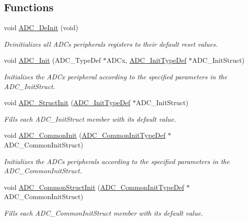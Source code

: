 \subsection*{Functions}
\begin{DoxyCompactItemize}
\item 
void \hyperlink{group___a_d_c_ga1962afdd9eebe5c896bbba2e4f26fe09}{A\-D\-C\-\_\-\-De\-Init} (void)
\begin{DoxyCompactList}\small\item\em Deinitializes all A\-D\-Cs peripherals registers to their default reset values. \end{DoxyCompactList}\item 
void \hyperlink{group___a_d_c_gabbab6038cf8691404350625e477254f9}{A\-D\-C\-\_\-\-Init} (A\-D\-C\-\_\-\-Type\-Def $\ast$A\-D\-Cx, \hyperlink{struct_a_d_c___init_type_def}{A\-D\-C\-\_\-\-Init\-Type\-Def} $\ast$A\-D\-C\-\_\-\-Init\-Struct)
\begin{DoxyCompactList}\small\item\em Initializes the A\-D\-Cx peripheral according to the specified parameters in the A\-D\-C\-\_\-\-Init\-Struct. \end{DoxyCompactList}\item 
void \hyperlink{group___a_d_c_ga6c6e754d1d0a98d56e465efaf73272ec}{A\-D\-C\-\_\-\-Struct\-Init} (\hyperlink{struct_a_d_c___init_type_def}{A\-D\-C\-\_\-\-Init\-Type\-Def} $\ast$A\-D\-C\-\_\-\-Init\-Struct)
\begin{DoxyCompactList}\small\item\em Fills each A\-D\-C\-\_\-\-Init\-Struct member with its default value. \end{DoxyCompactList}\item 
void \hyperlink{group___a_d_c_ga5803f6581a9cd7e90b6e637067102d94}{A\-D\-C\-\_\-\-Common\-Init} (\hyperlink{struct_a_d_c___common_init_type_def}{A\-D\-C\-\_\-\-Common\-Init\-Type\-Def} $\ast$A\-D\-C\-\_\-\-Common\-Init\-Struct)
\begin{DoxyCompactList}\small\item\em Initializes the A\-D\-Cs peripherals according to the specified parameters in the A\-D\-C\-\_\-\-Common\-Init\-Struct. \end{DoxyCompactList}\item 
void \hyperlink{group___a_d_c_gad60a6414b4932c704f6f7a7c2963fa2a}{A\-D\-C\-\_\-\-Common\-Struct\-Init} (\hyperlink{struct_a_d_c___common_init_type_def}{A\-D\-C\-\_\-\-Common\-Init\-Type\-Def} $\ast$A\-D\-C\-\_\-\-Common\-Init\-Struct)
\begin{DoxyCompactList}\small\item\em Fills each A\-D\-C\-\_\-\-Common\-Init\-Struct member with its default value. \end{DoxyCompactList}\item 

\end{DoxyCompactItemize}
